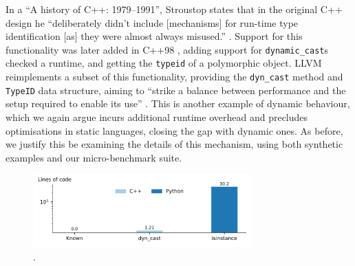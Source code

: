 In a ``A history of C++: 1979--1991'', Stroustop states that in the original C++ design he ``deliberately didn't include [mechanisms] for run-time type identification [as] they were almost always misused.'' \cite{stroustrupHistory197919911996}.
Support for this functionality was later added in C++98 \cite{internationalorganizationforstandardizationISOIEC148821998}, adding support for \texttt{dynamic\_cast}s checked a runtime, and getting the \texttt{typeid} of a polymorphic object.
LLVM reimplements a subset of this functionality, providing the \texttt{dyn\_cast} method and \texttt{TypeID} data structure, aiming to ``strike a balance between performance and the setup required to enable its use'' \cite{mlirteamMLIRCodeDocumentation}.
This is another example of dynamic behaviour, which we again argue incurs additional runtime overhead and precludes optimisations in static languages, closing the gap with dynamic ones.
As before, we justify this be examining the details of this mechanism, using both synthetic examples and our micro-benchmark suite.

\begin{figure}[H]
    \centering
    \includegraphics[width=0.75\textwidth]{images/impact_dynamism/dynamic_cast.pdf}
    \caption{.}
    \label{figure:impact-rtti}
\end{figure}

